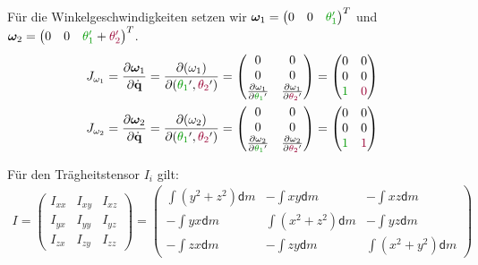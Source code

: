 \documentclass[a4paper, 12pt]{scrartcl}
\newcommand{\gruen}[2][gruen]{\textcolor{#1}{#2}}
\newcommand{\dunkelrot}[2][dunkelrot]{\textcolor{#1}{#2}}
\begin{document}
Für die Winkelgeschwindigkeiten setzen wir   
$\bm{\omega}_1 = \begin{pmatrix}0 & 0 & \gruen{\theta_1'}\end{pmatrix}^T$ und 
$\bm{\omega}_2 = \begin{pmatrix} 0 & 0 &\gruen{\theta_1'} + \dunkelrot{\theta_2'}\end{pmatrix}^T$.
\begin{align*}
    J_{\omega_1} &=
    \frac{\partial \bm{\omega}_1}{\partial \dot{\textbf{q}}}
    =
    \frac{\partial (\omega_1)}{\partial (\gruen{\theta_1}', \dunkelrot{\theta_2}')}
    =
    \begin{pmatrix}
        0 & 0 \\
        0 & 0 \\
        \frac{\partial \omega_1}{\partial \gruen{\theta_1}'} 
        & \frac{\partial \omega_1}{\partial \dunkelrot{\theta_2}'} 
    \end{pmatrix}
    =
    \begin{pmatrix}
        0 & 0 \\
        0 & 0 \\
        \gruen{1} & \dunkelrot{0}
    \end{pmatrix}
    \\
    J_{\omega_2} &=
    \frac{\partial \bm{\omega}_2}{\partial \dot{\textbf{q}}}
    =
    \frac{\partial (\omega_2)}{\partial (\gruen{\theta_1}', \dunkelrot{\theta_2}')}
    =
    \begin{pmatrix}
        0 & 0 \\
        0 & 0 \\
        \frac{\partial \omega_2}{\partial \gruen{\theta_1}'} 
        & \frac{\partial \omega_2}{\partial \dunkelrot{\theta_2}'} 
    \end{pmatrix}
    =
    \begin{pmatrix}
        0 & 0 \\
        0 & 0 \\
        \gruen{1} & \dunkelrot{1}
    \end{pmatrix}
\end{align*}

Für den Trägheitstensor $I_i$ gilt:
\begin{align*}
    I = 
    \begin{pmatrix}
        I_{xx} & I_{xy} & I_{xz} \\
        I_{yx} & I_{yy} & I_{yz} \\
        I_{zx} & I_{zy} & I_{zz}
    \end{pmatrix}   
    =
    \begin{pmatrix}
        \int (y^2 + z^2) \mathsf{d}m & -\int xy \mathsf{d}m & -\int xz \mathsf{d}m \\
        -\int yx \mathsf{d}m & \int (x^2 + z^2) \mathsf{d}m & -\int yz \mathsf{d}m \\
        -\int zx \mathsf{d}m & -\int zy \mathsf{d}m & \int (x^2 + y^2) \mathsf{d}m
    \end{pmatrix}
\end{align*}
\end{document}
